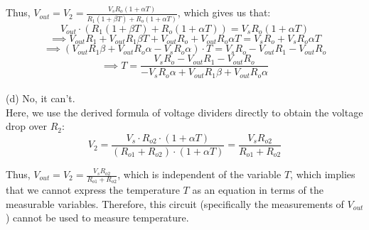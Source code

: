 \documentclass{article}
\begin{document}
Thus, $V_{out} = V_2 = \frac{V_s R_o(1+\alpha T)}{R_1(1+\beta T) + R_o(1+\alpha T)}$, which gives us that:
$$V_{out}\cdot(R_1(1+\beta T) + R_o(1+\alpha T)) = V_s R_o(1+\alpha T)$$
$$\implies V_{out}R_1 + V_{out}R_1\beta T + V_{out}R_o + V_{out}R_o\alpha T = V_sR_o + V_sR_o\alpha T$$
$$\implies (V_{out}R_1\beta + V_{out}R_o\alpha - V_sR_o\alpha)\cdot T = V_sR_o - V_{out}R_1 - V_{out}R_o$$
$$\implies T = \frac{V_sR_o - V_{out}R_1 - V_{out}R_o}{- V_sR_o\alpha + V_{out}R_1\beta + V_{out}R_o\alpha}$$ \\
{\large (d) No, it can't. } \\

Here, we use the derived formula of voltage dividers directly to obtain the voltage drop over $R_2$:
$$ V_2 = \frac{V_s\cdot R_{o2}\cdot(1+\alpha T)}{(R_{o1} + R_{o2})\cdot(1+\alpha T)} = \frac{V_sR_{o2}}{R_{o1} + R_{o2}}$$

Thus, $V_{out} = V_2 = \frac{V_sR_{o2}}{R_{o1} + R_{o2}}$, which is independent of the variable $T$, which implies that we cannot express the temperature $T$ as an equation in terms of the measurable variables. Therefore, this circuit (specifically the measurements of $V_{out}$) cannot be used to measure temperature. \\
\end{document}
